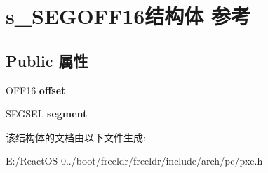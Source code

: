 \hypertarget{structs___s_e_g_o_f_f16}{}\section{s\+\_\+\+S\+E\+G\+O\+F\+F16结构体 参考}
\label{structs___s_e_g_o_f_f16}
\subsection*{Public 属性}
\begin{DoxyCompactItemize}
\item 
\mbox{\label{structs___s_e_g_o_f_f16_ac648191b9d0be1582efa04d96b697c47}} 
O\+F\+F16 {\bfseries offset}
\item 
\mbox{\label{structs___s_e_g_o_f_f16_a2ff6ed1eb1066e6c826e65d6466b387b}} 
S\+E\+G\+S\+EL {\bfseries segment}
\end{DoxyCompactItemize}


该结构体的文档由以下文件生成\+:\begin{DoxyCompactItemize}
\item 
E\+:/\+React\+O\+S-\/0../boot/freeldr/freeldr/include/arch/pc/pxe.\+h\end{DoxyCompactItemize}
